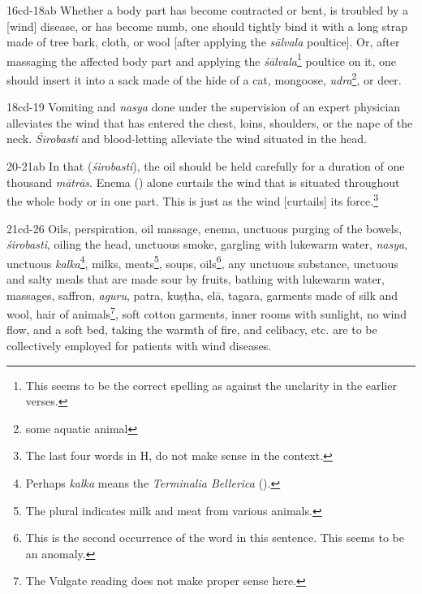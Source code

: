 \begin{translation}
    \item[16cd-18ab]
     Whether a body part has become contracted or bent, is troubled by a [wind] disease, or has become numb, one should tightly bind it with a long strap made of tree bark, cloth, or wool [after applying the \textit{sālvala} poultice]. Or, after massaging the affected body part and applying the \textit{śālvala}\footnote{This seems to be the correct spelling as against the unclarity in the earlier verses.} poultice on it, one should insert it into a sack made of the hide of a cat, mongoose, \textit{udra}\footnote{some aquatic animal}, or deer.

    \item[18cd-19]
    Vomiting and \textit{nasya} done under the supervision of an expert physician alleviates the wind that has entered the chest, loins, shoulders, or the nape of the neck. \textit{Śirobasti} and blood-letting alleviate the wind situated in the head. 

    \item[20-21ab]
    In that (\textit{śirobasti}), the oil should be held carefully for a duration of one thousand \textit{mātrās}. Enema () alone curtails the wind that is situated throughout the whole body or in one part. This is just as the wind [curtails] its force.\footnote{The last four words in H,  do not make sense in the context.} 

    \item[21cd-26]
    Oils, perspiration, oil massage, enema, unctuous purging of the bowels, \textit{śirobasti}, oiling the head, unctuous smoke, gargling with lukewarm water, \textit{nasya}, unctuous \textit{kalka}\footnote{Perhaps \textit{kalka} means the \textit{Terminalia Bellerica} ().}, milks, meats\footnote{The plural indicates milk and meat from various animals.}, soups, oils\footnote{This is the second occurrence of the word  in this sentence. This seems to be an anomaly.}, any unctuous substance, unctuous and salty meals that are made sour by fruits, bathing with lukewarm water, massages, saffron, \emph{aguru}, \gls{patra}, \gls{kuṣṭha}, \gls{elā}, \gls{tagara}, garments made of silk and wool, hair of animals\footnote{The Vulgate reading  does not make proper sense here.}, soft cotton garments, inner rooms with sunlight, no wind flow, and a soft bed, taking the warmth of fire, and celibacy, etc. are to be collectively employed for patients with wind diseases.    


\end{translation}
